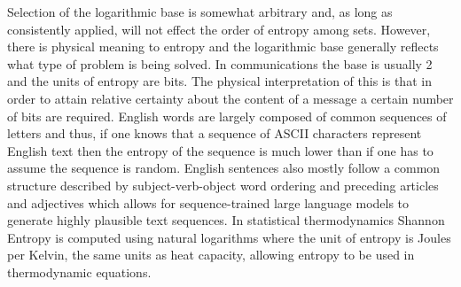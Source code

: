 Selection of the logarithmic base is somewhat arbitrary and, as long as consistently applied, will not effect the order of entropy among sets. However, there is physical meaning to entropy and the logarithmic base generally reflects what type of problem is being solved. In communications the base is usually 2 and the units of entropy are bits. The physical interpretation of this is that in order to attain relative certainty about the content of a message a certain number of bits are required. English words are largely composed of common sequences of letters and thus, if one knows that a sequence of ASCII characters represent English text then the entropy of the sequence is much lower than if one has to assume the sequence is random. English sentences also mostly follow a common structure described by subject-verb-object word ordering and preceding articles and adjectives which allows for sequence-trained large language models to generate highly plausible text sequences. In statistical thermodynamics Shannon Entropy is computed using natural logarithms where the unit of entropy is Joules per Kelvin, the same units as heat capacity, allowing entropy to be used in thermodynamic equations.


